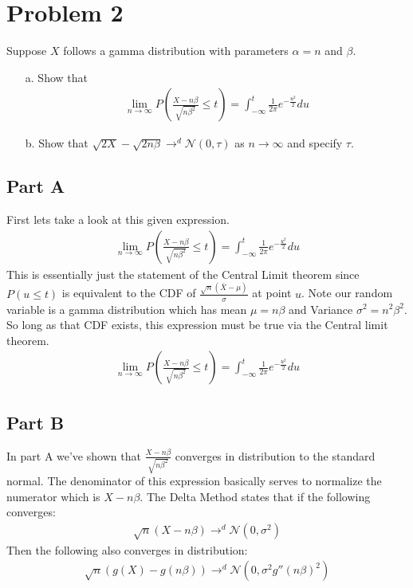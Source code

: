 \documentclass{article}
\begin{document}
\section*{Problem 2}
Suppose $X$ follows a gamma distribution with parameters $\alpha = n$ and $\beta$.
\begin{enumerate}
\item[a.] Show that
\begin{align*}
\lim_{n\rightarrow \infty} P(\frac{X-n\beta}{\sqrt{n\beta^2}} \leq t) = \int_{-\infty}^{t} \frac{1}{2\pi} e^{-\frac{u^2}{2}} du
\end{align*}
\item[b.] Show that $\sqrt{2X} - \sqrt{2n\beta} \rightarrow^d \mathcal{N}(0,\tau)$ as $n\rightarrow \infty$ and specify $\tau$.
\end{enumerate}
\subsection*{Part A}
First lets take a look at this given expression.
\begin{align*}
\lim_{n\rightarrow \infty} P(\frac{X-n\beta}{\sqrt{n\beta^2}} \leq t) = \int_{-\infty}^{t} \frac{1}{2\pi} e^{-\frac{u^2}{2}} du
\end{align*}
This is essentially just the statement of the Central Limit theorem since $P(u \leq t)$ is equivalent to the CDF of $\frac{\sqrt{n}(\bar{X}-\mu)}{\sigma}$ at point $u$. Note our random variable is a gamma distribution which has mean $\mu=n\beta$ and Variance $\sigma^2=n^2 \beta^2$. So long as that CDF exists, this expression must be true via the Central limit theorem.
\begin{align*}
\boxed{ \lim_{n\rightarrow \infty} P(\frac{X-n\beta}{\sqrt{n\beta^2}} \leq t) = \int_{-\infty}^{t} \frac{1}{2\pi} e^{-\frac{u^2}{2}} du }
\end{align*}

\subsection*{Part B}
In part A we've shown that $\frac{X-n\beta}{\sqrt{n\beta^2}}$ converges in distribution to the standard normal. The denominator of this expression basically serves to normalize the numerator which is $X-n\beta$. The Delta Method states that if the following converges:
\begin{align*}
\sqrt{n}(X-n\beta) \rightarrow^d \mathcal{N}(0,\sigma^2)
\end{align*}
Then the following also converges in distribution:
\begin{align*}
\sqrt{n}(g(X)-g(n\beta)) \rightarrow^d \mathcal{N}(0,\sigma^2 g''(n\beta)^2)
\end{align*}
\end{document}
